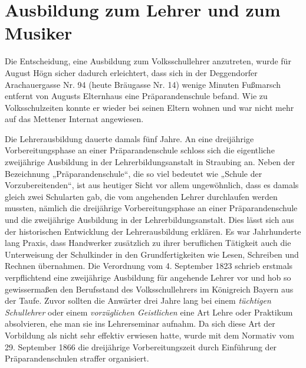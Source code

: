 \documentclass{book}
\newcommand{\zitat}[1]{\textit{#1}}
\begin{document}
\section{Ausbildung zum Lehrer und zum Musiker}

Die Entscheidung, eine Ausbildung zum Volksschullehrer anzutreten, wurde
für August Högn sicher dadurch erleichtert, dass sich in der
Deggendorfer Arachauergasse Nr. 94 (heute Bräugasse Nr. 14) wenige
Minuten Fußmarsch entfernt von Augusts Elternhaus eine
Präparandenschule befand. Wie zu Volksschulzeiten konnte er wieder bei
seinen Eltern wohnen und war nicht mehr auf das Mettener Internat
angewiesen. 

Die Lehrerausbildung dauerte damals fünf Jahre. An eine dreijährige
Vor\-bereitungsphase an einer Präparandenschule schloss sich die
eigentliche zwei\-jährige Ausbildung in der Lehrerbildungsanstalt in
Straubing an. Neben der Bezeichnung „Präparandenschule“, die so viel
bedeutet wie „Schule der Vor\-zubereitenden“, ist aus heutiger Sicht
vor allem ungewöhnlich, dass es damals gleich zwei Schularten gab, die
vom angehenden Lehrer durchlaufen werden mussten, nämlich die
dreijährige Vorbereitungsphase an einer Präparanden\-schule und die
zweijährige Ausbildung in der Lehrerbildungsanstalt. Dies lässt sich
aus der historischen Entwicklung der Lehrerausbildung erklären. Es war
Jahrhunderte lang Praxis, dass Handwerker zusätzlich zu ihrer
beruflichen Tätigkeit auch die Unterweisung der Schulkinder in den
Grundfertigkeiten wie Lesen, Schreiben und Rechnen übernahmen. Die
Verordnung vom 4. Sep\-tember 1823 schrieb erstmals verpflichtend eine
zweijährige Ausbildung für angehende Lehrer vor und hob so
gewissermaßen den Berufsstand des Volks\-schullehrers im Königreich
Bayern aus der Taufe. Zuvor sollten die Anwärter drei Jahre lang bei
einem \zitat{tüchtigen Schullehrer} oder einem
\zitat{vorzüglichen Geistlichen} eine Art Lehre oder
Praktikum absolvieren, ehe man sie ins Lehrerseminar aufnahm. Da sich
diese Art der Vorbildung als nicht sehr effektiv erwiesen hatte, wurde
mit dem Normativ vom 29. September 1866 die dreijährige
Vor\-bereitungszeit durch Einführung der Präparandenschulen straffer
organisiert.
\end{document}
